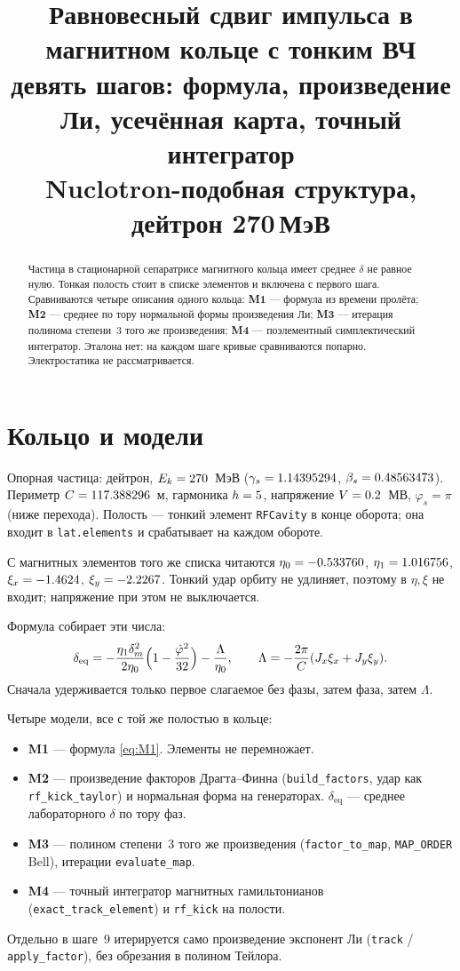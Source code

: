 \documentclass[a4paper,11pt]{article}
\title{Равновесный сдвиг импульса в магнитном кольце с тонким ВЧ\\
\large девять шагов: формула, произведение Ли, усечённая карта, точный интегратор\\
\normalsize Nuclotron-подобная структура, дейтрон 270\,МэВ}
\author{}\date{}
\newcommand{\deq}{\delta_{\mathrm{eq}}}
\newcommand{\Mone}{\textbf{M1}}\newcommand{\Mtwo}{\textbf{M2}}
\newcommand{\Mthree}{\textbf{M3}}\newcommand{\Mfour}{\textbf{M4}}
\begin{document}
\maketitle

\begin{abstract}
Частица в стационарной сепаратрисе магнитного кольца имеет среднее $\delta$ не равное нулю. Тонкая полость стоит в списке элементов и включена с первого шага. Сравниваются четыре описания одного кольца: \Mone{} --- формула из времени пролёта; \Mtwo{} --- среднее по тору нормальной формы произведения Ли; \Mthree{} --- итерация полинома степени~3 того же произведения; \Mfour{} --- поэлементный симплектический интегратор. Эталона нет: на каждом шаге кривые сравниваются попарно. Электростатика не рассматривается.
\end{abstract}

\tableofcontents
\clearpage

\section{Кольцо и модели}
Опорная частица: дейтрон, $E_k=270$~МэВ ($\gamma_s=1.14395294$, $\beta_s=0.48563473$). Периметр $C=117.388296$~м, гармоника $h=5$, напряжение $V=0.2$~МВ, $\varphi_s=\pi$ (ниже перехода). Полость --- тонкий элемент \texttt{RFCavity} в конце оборота; она входит в \texttt{lat.elements} и срабатывает на каждом обороте.

С магнитных элементов того же списка читаются $\eta_0=-0.533760$, $\eta_1=1.016756$, $\xi_x=-1.4624$, $\xi_y=-2.2267$. Тонкий удар орбиту не удлиняет, поэтому в $\eta,\xi$ не входит; напряжение при этом не выключается.

Формула собирает эти числа:
\begin{equation}\label{eq:M1}
\deq=-\frac{\eta_1\delta_m^2}{2\eta_0}\Bigl(1-\frac{\hat\varphi^2}{32}\Bigr)-\frac{\Lambda}{\eta_0},
\qquad \Lambda=-\frac{2\pi}{C}(J_x\xi_x+J_y\xi_y).
\end{equation}
Сначала удерживается только первое слагаемое без фазы, затем фаза, затем $\Lambda$.

Четыре модели, все с той же полостью в кольце:
\begin{itemize}
\item \Mone{} --- формула \eqref{eq:M1}. Элементы не перемножает.
\item \Mtwo{} --- произведение факторов Драгта--Финна (\texttt{build\_factors}, удар как \texttt{rf\_kick\_taylor}) и нормальная форма на генераторах. $\deq$ --- среднее лабораторного $\delta$ по тору фаз.
\item \Mthree{} --- полином степени~3 того же произведения (\texttt{factor\_to\_map}, \texttt{MAP\_ORDER} Bell), итерации \texttt{evaluate\_map}.
\item \Mfour{} --- точный интегратор магнитных гамильтонианов (\texttt{exact\_track\_element}) и \texttt{rf\_kick} на полости.
\end{itemize}
Отдельно в шаге~9 итерируется само произведение экспонент Ли (\texttt{track} / \texttt{apply\_factor}), без обрезания в полином Тейлора.
\end{document}
